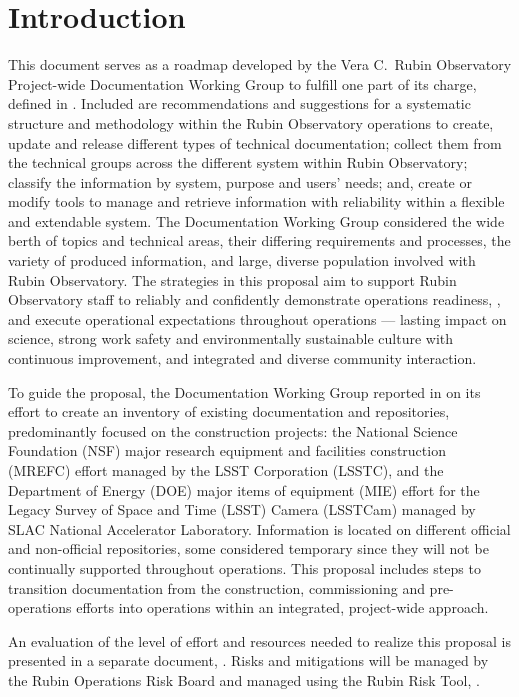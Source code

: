 \section{Introduction}

This document serves as a roadmap developed by the Vera C.\ Rubin Observatory Project-wide Documentation Working Group to fulfill one part of its charge,  defined in .
Included are recommendations and suggestions for a systematic structure and methodology within the Rubin Observatory operations to create, update and release different types of technical documentation; collect them from the technical groups across the different system within Rubin Observatory; classify the information by system, purpose and users' needs; and, create or modify tools to manage and retrieve information with reliability within a flexible and extendable system.
The Documentation Working Group considered the wide berth of topics and technical areas, their differing requirements and processes, the variety of produced information, and large, diverse population involved with Rubin Observatory.
The strategies in this proposal aim to support Rubin Observatory staff to reliably and confidently demonstrate operations readiness, ,  and execute operational expectations throughout operations --- lasting impact on science, strong work safety and environmentally sustainable culture with continuous improvement, and integrated and diverse community interaction.

To guide the proposal, the Documentation Working Group reported in  on its effort to create an inventory of existing documentation and repositories,  predominantly focused on the construction projects: the National Science Foundation (NSF) major research equipment and facilities construction (MREFC) effort managed by the LSST Corporation (LSSTC), and the Department of Energy (DOE) major items of equipment (MIE) effort for the Legacy Survey of Space and Time (LSST) Camera (LSSTCam) managed by SLAC National Accelerator Laboratory.
Information is located on different official and non-official repositories, some considered temporary since they will not be continually supported throughout operations.
This proposal includes steps to transition documentation from the construction, commissioning and pre-operations efforts into operations within an integrated, project-wide approach.

An evaluation of the level of effort and resources needed to realize this proposal is presented in a separate document, . 
Risks and mitigations will be managed by the Rubin Operations Risk Board and managed using the Rubin Risk Tool, .

